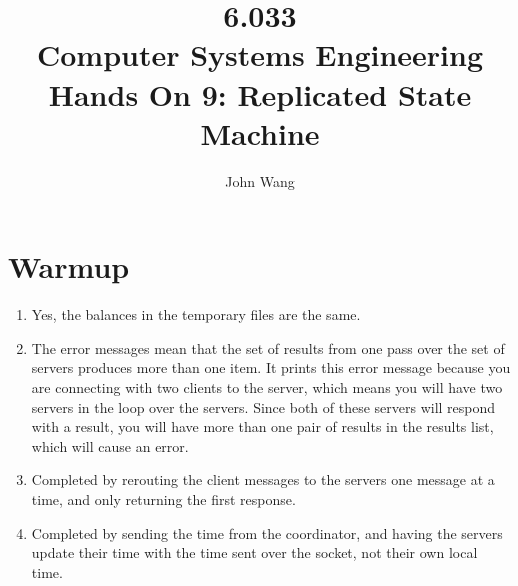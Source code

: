 \documentclass[psamsfonts]{amsart}
\title{6.033 \\
Computer Systems Engineering \\
Hands On 9: Replicated State Machine}
\author{John Wang}
\begin{document}
\maketitle

\section{Warmup}

\begin{enumerate}
  \item Yes, the balances in the temporary files are the same.
  \item The error messages mean that the set of results from one pass over the set of servers produces more than one item. It prints this error message because you are connecting with two clients to the server, which means you will have two servers in the loop over the servers. Since both of these servers will respond with a result, you will have more than one pair of results in the results list, which will cause an error.
  \item Completed by rerouting the client messages to the servers one message at a time, and only returning the first response.
  \item Completed by sending the time from the coordinator, and having the servers update their time with the time sent over the socket, not their own local time.
\end{enumerate}
\end{document}
